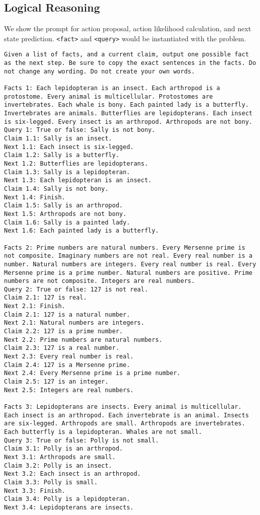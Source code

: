 \subsection{Logical Reasoning}
We show the prompt for action proposal, action likelihood calculation, and next state prediction. \texttt{<fact>} and \texttt{<query>} would be instantiated with the problem.
\begin{lstlisting}[breaklines=true,breakatwhitespace=true]
Given a list of facts, and a current claim, output one possible fact as the next step. Be sure to copy the exact sentences in the facts. Do not change any wording. Do not create your own words.

Facts 1: Each lepidopteran is an insect. Each arthropod is a protostome. Every animal is multicellular. Protostomes are invertebrates. Each whale is bony. Each painted lady is a butterfly. Invertebrates are animals. Butterflies are lepidopterans. Each insect is six-legged. Every insect is an arthropod. Arthropods are not bony.
Query 1: True or false: Sally is not bony.
Claim 1.1: Sally is an insect.
Next 1.1: Each insect is six-legged.
Claim 1.2: Sally is a butterfly.
Next 1.2: Butterflies are lepidopterans.
Claim 1.3: Sally is a lepidopteran.
Next 1.3: Each lepidopteran is an insect.
Claim 1.4: Sally is not bony.
Next 1.4: Finish.
Claim 1.5: Sally is an arthropod.
Next 1.5: Arthropods are not bony.
Claim 1.6: Sally is a painted lady.
Next 1.6: Each painted lady is a butterfly.

Facts 2: Prime numbers are natural numbers. Every Mersenne prime is not composite. Imaginary numbers are not real. Every real number is a number. Natural numbers are integers. Every real number is real. Every Mersenne prime is a prime number. Natural numbers are positive. Prime numbers are not composite. Integers are real numbers.
Query 2: True or false: 127 is not real.
Claim 2.1: 127 is real.
Next 2.1: Finish.
Claim 2.1: 127 is a natural number.
Next 2.1: Natural numbers are integers.
Claim 2.2: 127 is a prime number.
Next 2.2: Prime numbers are natural numbers.
Claim 2.3: 127 is a real number.
Next 2.3: Every real number is real.
Claim 2.4: 127 is a Mersenne prime.
Next 2.4: Every Mersenne prime is a prime number.
Claim 2.5: 127 is an integer.
Next 2.5: Integers are real numbers.

Facts 3: Lepidopterans are insects. Every animal is multicellular. Each insect is an arthropod. Each invertebrate is an animal. Insects are six-legged. Arthropods are small. Arthropods are invertebrates. Each butterfly is a lepidopteran. Whales are not small.
Query 3: True or false: Polly is not small.
Claim 3.1: Polly is an arthropod.
Next 3.1: Arthropods are small.
Claim 3.2: Polly is an insect.
Next 3.2: Each insect is an arthropod.
Claim 3.3: Polly is small.
Next 3.3: Finish.
Claim 3.4: Polly is a lepidopteran.
Next 3.4: Lepidopterans are insects.


\end{lstlisting}
